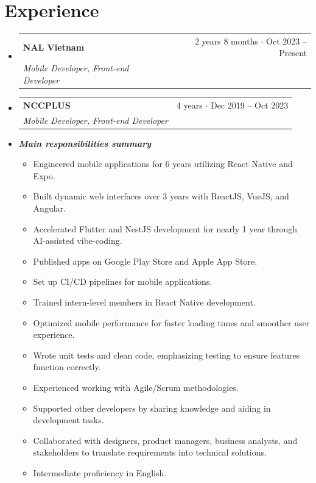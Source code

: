 \documentclass[letterpaper,11pt]{article}
\makeatletter
\newcommand{\resumeSubheading}[4]{
  \vspace{-1pt}\item
    \begin{tabular*}{0.97\textwidth}[t]{l@{\extracolsep{\fill}}r}
      \textbf{#1} & #2 \\
      \textit{\small #3} & \textit{\small #4} \\
    \end{tabular*}\vspace{-5pt}
}
\newcommand{\resumeItemPlain}[1]{
  \item\small{
    {#1 \vspace{0pt}}
  }
}
\newcommand{\resumeSubHeadingListStart}{\begin{itemize}[leftmargin=*]}
\newcommand{\resumeSubHeadingListEnd}{\end{itemize}}
\newcommand{\resumeItemListStart}{\begin{itemize}}
\newcommand{\resumeItemListEnd}{\end{itemize}\vspace{-5pt}}
\makeatother
\begin{document}
\section{Experience}
  \resumeSubHeadingListStart

    \resumeSubheading
      {NAL Vietnam}{2 years 8 months $\cdot$ Oct 2023 -- Present}
      {Mobile Developer, Front-end Developer}{}

    \resumeSubheading
      {NCCPLUS}{4 years $\cdot$ Dec 2019 -- Oct 2023}
      {Mobile Developer, Front-end Developer}{}

    \vspace{6pt}
    \item[]\small\textbf{\textit{Main responsibilities summary}}\vspace{-7pt}

    \resumeItemListStart
      \resumeItemPlain{Engineered mobile applications for 6 years utilizing React Native and Expo.}
      \resumeItemPlain{Built dynamic web interfaces over 3 years with ReactJS, VueJS, and Angular.}
      \resumeItemPlain{Accelerated Flutter and NestJS development for nearly 1 year through AI-assisted vibe-coding.}
      \resumeItemPlain{Published apps on Google Play Store and Apple App Store.}
      \resumeItemPlain{Set up CI/CD pipelines for mobile applications.}
      \resumeItemPlain{Trained intern-level members in React Native development.}
      \resumeItemPlain{Optimized mobile performance for faster loading times and smoother user experience.}
      \resumeItemPlain{Wrote unit tests and clean code, emphasizing testing to ensure features function correctly.}
      \resumeItemPlain{Experienced working with Agile/Scrum methodologies.}
      \resumeItemPlain{Supported other developers by sharing knowledge and aiding in development tasks.}
      \resumeItemPlain{Collaborated with designers, product managers, business analysts, and stakeholders to translate requirements into technical solutions.}
      \resumeItemPlain{Intermediate proficiency in English.}
    \resumeItemListEnd

  \resumeSubHeadingListEnd


\end{document}

